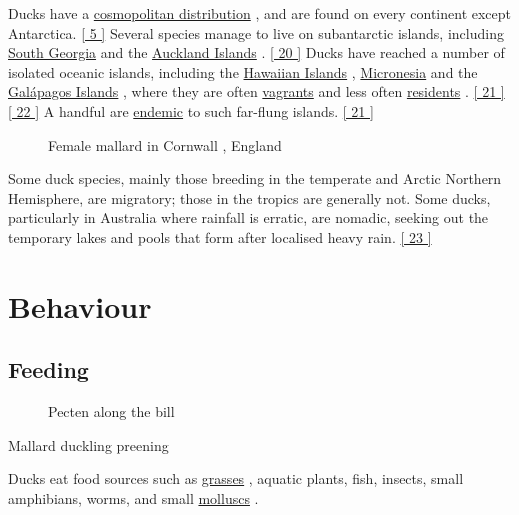\documentclass[11pt,a4paper]{article}
\begin{document}
Ducks have a \href{/wiki/Cosmopolitan\_distribution}{cosmopolitan distribution} , and are found on every continent except Antarctica. \href{\#cite\_note-FOOTNOTECarboneras1992536-5}{[ 5 ]} Several species manage to live on subantarctic islands, including \href{/wiki/South\_Georgia\_and\_the\_South\_Sandwich\_Islands}{South Georgia} and the \href{/wiki/Auckland\_Islands}{Auckland Islands} . \href{\#cite\_note-FOOTNOTEShirihai2008239,\_245-20}{[ 20 ]} Ducks have reached a number of isolated oceanic islands, including the \href{/wiki/Hawaiian\_Islands}{Hawaiian Islands} , \href{/wiki/Micronesia}{Micronesia} and the \href{/wiki/Gal\%C3\%A1pagos\_Islands}{Galápagos Islands} , where they are often \href{/wiki/Glossary\_of\_bird\_terms\#vagrants}{vagrants} and less often \href{/wiki/Glossary\_of\_bird\_terms\#residents}{residents} . \href{\#cite\_note-FOOTNOTEPrattBrunerBerrett198798–107-21}{[ 21 ]} \href{\#cite\_note-FOOTNOTEFitterFitterHosking200052–3-22}{[ 22 ]} A handful are \href{/wiki/Endemic}{endemic} to such far-flung islands. \href{\#cite\_note-FOOTNOTEPrattBrunerBerrett198798–107-21}{[ 21 ]}

\begin{figure}[h]
\caption{Female mallard in Cornwall , England}
\end{figure}

Some duck species, mainly those breeding in the temperate and Arctic Northern Hemisphere, are migratory; those in the tropics are generally not. Some ducks, particularly in Australia where rainfall is erratic, are nomadic, seeking out the temporary lakes and pools that form after localised heavy rain. \href{\#cite\_note-23}{[ 23 ]}

\section{Behaviour}

\subsection{Feeding}

\begin{figure}[h]
\caption{Pecten along the bill}
\end{figure}

Mallard duckling preening

Ducks eat food sources such as \href{/wiki/Poaceae}{grasses} , aquatic plants, fish, insects, small amphibians, worms, and small \href{/wiki/Mollusc}{molluscs} .
\end{document}
